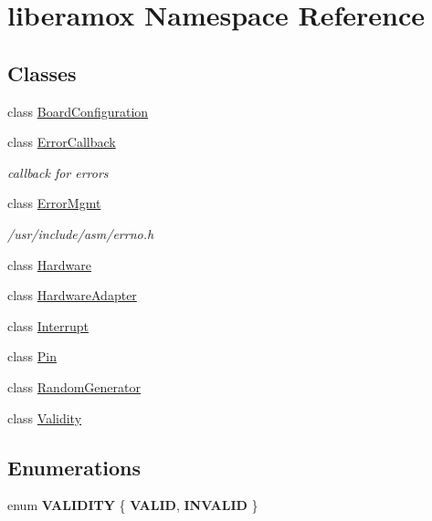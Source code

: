 \hypertarget{namespaceliberamox}{}\section{liberamox Namespace Reference}
\label{namespaceliberamox}
\subsection*{Classes}
\begin{DoxyCompactItemize}
\item 
class \hyperlink{classliberamox_1_1BoardConfiguration}{Board\+Configuration}
\item 
class \hyperlink{classliberamox_1_1ErrorCallback}{Error\+Callback}
\begin{DoxyCompactList}\small\item\em callback for errors \end{DoxyCompactList}\item 
class \hyperlink{classliberamox_1_1ErrorMgmt}{Error\+Mgmt}
\begin{DoxyCompactList}\small\item\em /usr/include/asm/errno.h \end{DoxyCompactList}\item 
class \hyperlink{classliberamox_1_1Hardware}{Hardware}
\item 
class \hyperlink{classliberamox_1_1HardwareAdapter}{Hardware\+Adapter}
\item 
class \hyperlink{classliberamox_1_1Interrupt}{Interrupt}
\item 
class \hyperlink{classliberamox_1_1Pin}{Pin}
\item 
class \hyperlink{classliberamox_1_1RandomGenerator}{Random\+Generator}
\item 
class \hyperlink{classliberamox_1_1Validity}{Validity}
\end{DoxyCompactItemize}
\subsection*{Enumerations}
\begin{DoxyCompactItemize}
\item 
enum {\bfseries V\+A\+L\+I\+D\+I\+TY} \{ {\bfseries V\+A\+L\+ID}, 
{\bfseries I\+N\+V\+A\+L\+ID}
 \}\hypertarget{namespaceliberamox_ad8baa72401aa229b2ee21dc4bc3b32c7}{}\label{namespaceliberamox_ad8baa72401aa229b2ee21dc4bc3b32c7}

\end{DoxyCompactItemize}


